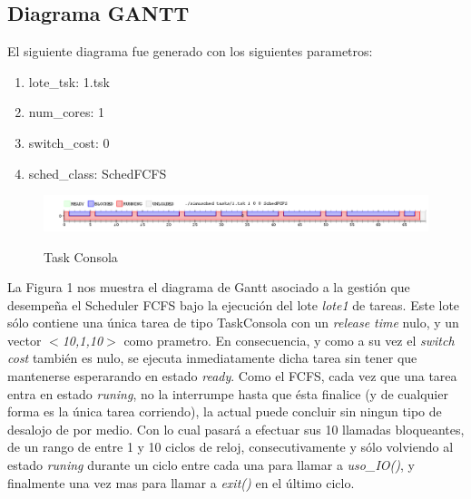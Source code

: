 \subsection{Diagrama GANTT}

El siguiente diagrama fue generado con los siguientes parametros:

\begin{enumerate}
	\item lote\_tsk: 1.tsk
	\item num\_cores: 1
	\item switch\_cost: 0
	\item sched\_class: SchedFCFS
\end{enumerate}

\begin{figure}[h]
    \includegraphics[width=\linewidth]{images/1.png}
    \label{fig:Task Consola}
    \caption{Task Consola}
\end{figure}

La Figura 1 nos muestra el diagrama de Gantt asociado a la gesti\'on que desempeña el Scheduler FCFS bajo la ejecuci\'on del lote \textit{lote1} de tareas. Este lote s\'olo contiene una \'unica tarea de tipo TaskConsola con un \textit{release time} nulo, y un vector \textit{$<$10,1,10$>$} como prametro. En consecuencia, y como a su vez el \textit{switch cost} tambi\'en es nulo, se ejecuta inmediatamente dicha tarea sin tener que mantenerse esperarando en estado \textit{ready}. Como el FCFS, cada vez que una tarea entra en estado \textit{runing}, no la interrumpe hasta que \'esta finalice (y de cualquier forma es la \'unica tarea corriendo), la actual puede concluir sin ningun tipo de desalojo de por medio. Con lo cual pasar\'a a efectuar sus 10 llamadas bloqueantes, de un rango de entre 1 y 10 ciclos de reloj, consecutivamente y s\'olo volviendo al estado \textit{runing} durante un ciclo entre cada una para llamar a \textit{uso\_IO()}, y finalmente una vez mas para llamar a \textit{exit()} en el \'ultimo ciclo.